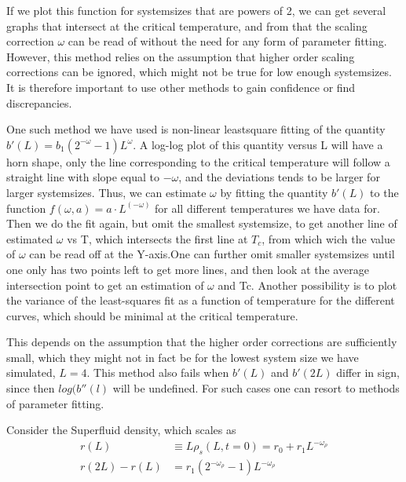 If we plot this function for systemsizes that are powers of 2, we can get several graphs that intersect at the critical temperature, and from that the scaling correction $\omega$ can be read of without the need for any form of parameter fitting. 
However, this method relies on the assumption that higher order scaling corrections can be ignored, which might not be true for low enough systemsizes.
It is therefore important to use other methods to gain confidence or find discrepancies.

One such method we have used is non-linear leastsquare fitting of the quantity $b'(L) = b_1(2^{-\omega} -1)L^{\omega}$.
A log-log plot of this quantity versus L will have a horn shape, only the line corresponding to the critical temperature will follow a straight line with slope equal to $-\omega$, and the deviations tends to be larger for larger systemsizes.
Thus, we can estimate $\omega$ by fitting the quantity $b'(L)$ to the function $f(\omega,a) = a\cdot L^(-\omega)$ for all different temperatures we have data for. Then we do the fit again, but omit the smallest systemsize, to get another line of estimated $\omega$ vs T, which intersects the first line at $T_c$, from which wich the value of $\omega$ can be read off at the Y-axis.One can further omit smaller systemsizes until one only has two points left to get more lines, and then look at the average intersection point to get an estimation of $\omega$ and Tc.
Another possibility is to plot the variance of the least-squares fit as a function of temperature for the different curves, which should be minimal at the critical temperature.

This depends on the assumption that the higher order corrections are sufficiently small, which they might not in fact be for the lowest system size we have simulated, $L=4$.
This method also fails when $b'(L)$ and $b'(2L)$ differ in sign, since then $log(b''(l)$ will be undefined.
For such cases one can resort to methods of parameter fitting.

Consider the Superfluid density, which scales as 
\begin{align}
  r(L)&\equiv L \rho_s(L,t=0)  = r_0 + r_1L^{-\omega_\rho}\\
  r(2L) - r(L) &= r_1(2^{-\omega_\rho} -1)L^{-\omega_\rho}
\end{align}


